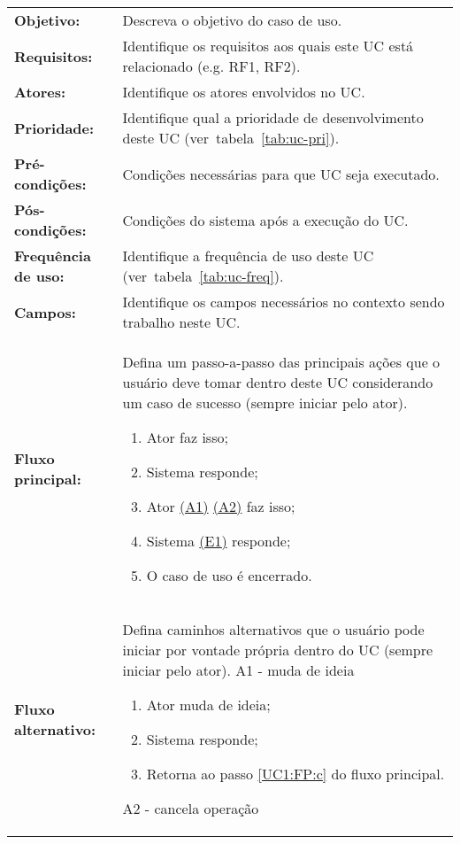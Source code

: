\documentclass[12pt,openright,a4paper,brazil]{abntex2}
\begin{document}
\begin{longtable}{p{.25\linewidth}p{.7\linewidth}}
\textbf{Objetivo:} & Descreva o objetivo do caso de uso. \\
\textbf{Requisitos:} & Identifique os requisitos aos quais este UC está relacionado (e.g. RF1, RF2). \\
\textbf{Atores:} & Identifique os atores envolvidos no UC. \\
\textbf{Prioridade:} & Identifique qual a prioridade de desenvolvimento deste UC (ver~tabela~\ref{tab:uc-pri}). \\
\textbf{Pré-condições:} & Condições necessárias para que UC seja executado. \\
\textbf{Pós-condições:} & Condições do sistema após a execução do UC. \\
\textbf{Frequência de uso: } & Identifique a frequência de uso deste UC (ver~tabela~\ref{tab:uc-freq}).\\
\textbf{Campos:} & Identifique os campos necessários no contexto sendo trabalho neste UC. \\
\textbf{Fluxo principal:} & 
Defina um passo-a-passo das principais ações que o usuário deve tomar dentro deste UC considerando um caso de sucesso (sempre iniciar pelo ator).
\begin{enumerate}[label=\alph*)]
	\item \label{UC1:FP:a} Ator faz isso;
	\item Sistema responde;
	\item \label{UC1:FP:c} Ator \hyperref[UC1:FA:A1]{(A1)} \hyperref[UC1:FA:A2]{(A2)} faz isso;
	\item Sistema \hyperref[UC1:FE:E1]{(E1)} responde;
	\item O caso de uso é encerrado.
\end{enumerate} \\
\textbf{Fluxo alternativo:} & 
Defina caminhos alternativos que o usuário pode iniciar por vontade própria dentro do UC (sempre iniciar pelo ator).
\vspace{\onelineskip}
\label{UC1:FA:A1} A1 - muda de ideia
\begin{enumerate}[label=\alph*)]
	\item Ator muda de ideia;
	\item Sistema responde;
	\item Retorna ao passo \ref{UC1:FP:c} do fluxo principal.
\end{enumerate} 
\label{UC1:FA:A2} A2 - cancela operação
\begin{enumerate}[label=\alph*)]

\end{enumerate}
\end{longtable}
\end{document}
